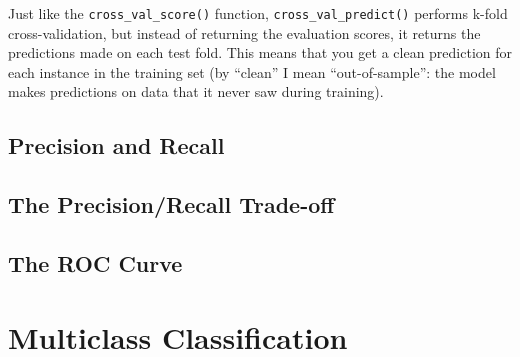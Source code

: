 Just like the \verb|cross_val_score()| function, \verb|cross_val_predict()| performs k-fold cross-validation, but instead of returning the evaluation scores, it returns the predictions made on each test fold. This means that you get a clean prediction for each instance in the training set (by ``clean” I mean ``out-of-sample”: the model makes predictions on data that it never saw during training).
\subsection{Precision and Recall}
\subsection{The Precision/Recall Trade-off}
\subsection{The ROC Curve}
\section{Multiclass Classification}
\subsection{}
\subsection{}
\section{}
\subsection{}
\subsection{}
\section{}
\section{}
\section{}
